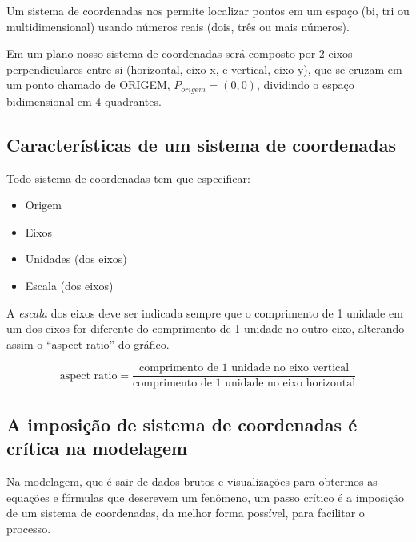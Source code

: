 \documentclass[pdftex, brazil, 12pt, twoside]{article}
\begin{document}
Um sistema de coordenadas nos permite localizar pontos em um espaço (bi, tri ou
multidimensional) usando números reais (dois, três ou mais números).

Em um plano nosso sistema de coordenadas será composto por 2 eixos perpendiculares
entre si (horizontal, eixo-x, e vertical, eixo-y), que se cruzam em um ponto
chamado de ORIGEM, $P_{origem} = (0, 0)$, dividindo o espaço bidimensional
em 4 quadrantes.

\subsection{Características de um sistema de coordenadas}
\label{sistema-coordenadas-caracteristicas}

Todo sistema de coordenadas tem que especificar:

\begin{itemize}[noitemsep]
\item Origem
\item Eixos
\item Unidades (dos eixos)
\item Escala (dos eixos)
\end{itemize}

A \emph{escala} dos eixos deve ser indicada sempre que o comprimento de 1 unidade em um dos
eixos for diferente do comprimento de 1 unidade no outro eixo, alterando assim o
``aspect ratio'' do gráfico.

\begin{equation}
  \text{aspect ratio} = \frac{\text{comprimento de 1 unidade no eixo vertical}}{\text{comprimento de 1 unidade no eixo horizontal}}
\end{equation}


\subsection{A imposição de sistema de coordenadas é crítica na modelagem}
\label{sistema-coordenadas-critico-modelagem}

Na modelagem, que é sair de dados brutos e visualizações para obtermos as equações
e fórmulas que descrevem um fenômeno, um passo crítico é a imposição de um sistema
de coordenadas, da melhor forma possível, para facilitar o processo.
\end{document}
